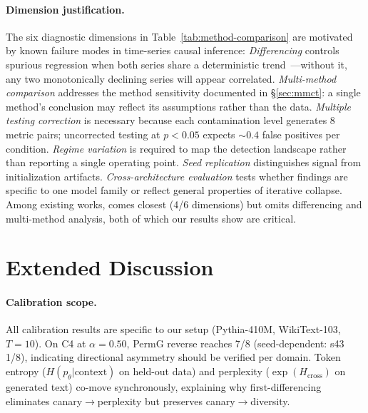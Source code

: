 \paragraph{Dimension justification.}
The six diagnostic dimensions in Table~\ref{tab:method-comparison} are motivated by known failure modes in time-series causal inference:
\emph{Differencing} controls spurious regression when both series share a deterministic trend~\citep{granger1974spurious}---without it, any two monotonically declining series will appear correlated.
\emph{Multi-method comparison} addresses the method sensitivity documented in \S\ref{sec:mmct}: a single method's conclusion may reflect its assumptions rather than the data.
\emph{Multiple testing correction} is necessary because each contamination level generates 8 metric pairs; uncorrected testing at $p{<}0.05$ expects ${\sim}0.4$ false positives per condition.
\emph{Regime variation} is required to map the detection landscape rather than reporting a single operating point.
\emph{Seed replication} distinguishes signal from initialization artifacts.
\emph{Cross-architecture evaluation} tests whether findings are specific to one model family or reflect general properties of iterative collapse.
Among existing works, \citet{du2025scales} comes closest (4/6 dimensions) but omits differencing and multi-method analysis, both of which our results show are critical.

\section{Extended Discussion}
\label{app:extended_discussion}

\paragraph{Calibration scope.}
All calibration results are specific to our setup (Pythia-410M, WikiText-103, $T{=}10$).
On C4 at $\alpha{=}0.50$, PermG reverse reaches 7/8 (seed-dependent: s43 1/8), indicating directional asymmetry should be verified per domain.
Token entropy ($H(p_\theta|\text{context})$ on held-out data) and perplexity ($\exp(H_\text{cross})$ on generated text) co-move synchronously, explaining why first-differencing eliminates canary$\to$perplexity but preserves canary$\to$diversity.

